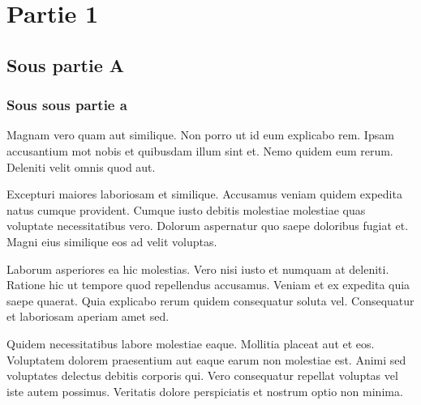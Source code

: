 \section{Partie 1}
\subsection{Sous partie A}
\subsubsection{Sous sous partie a}

Magnam vero quam aut similique. Non porro ut id eum explicabo rem. Ipsam accusantium \gls{mot} nobis et quibusdam illum sint et. Nemo quidem eum rerum. Deleniti velit omnis quod aut.

Excepturi maiores laboriosam et similique. Accusamus veniam quidem expedita natus cumque provident. Cumque iusto debitis molestiae molestiae quas voluptate necessitatibus vero. Dolorum aspernatur quo saepe doloribus fugiat et. Magni eius similique eos ad velit voluptas.

Laborum asperiores ea hic molestias. Vero nisi iusto et numquam at deleniti. Ratione hic ut tempore quod repellendus accusamus. Veniam et ex expedita quia saepe quaerat. Quia explicabo rerum quidem consequatur soluta vel. Consequatur et laboriosam aperiam amet sed.

Quidem necessitatibus labore molestiae eaque. Mollitia placeat aut et eos. Voluptatem dolorem praesentium aut eaque earum non molestiae est. Animi sed voluptates delectus debitis corporis qui. Vero consequatur repellat voluptas vel iste autem possimus. Veritatis dolore perspiciatis et nostrum optio non minima.

